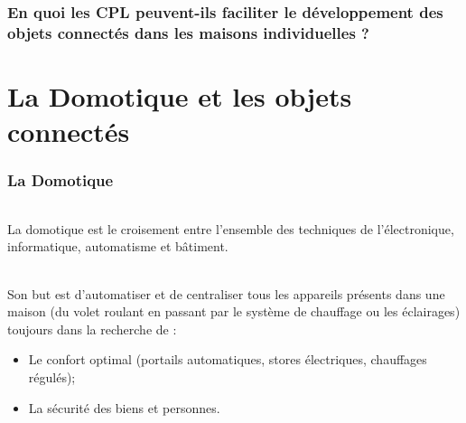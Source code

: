     \section*{En quoi les CPL peuvent-ils faciliter le développement des objets connectés dans les maisons individuelles ?}
    \clearpage


\part{La Domotique et les objets connectés}
    \section{La Domotique}
        \paragraph{}
La domotique est le croisement entre l’ensemble des techniques de l’électronique, informatique, automatisme et bâtiment.
        \paragraph{}
Son but est d’automatiser et de centraliser tous les appareils présents dans une maison
(du volet roulant en passant par le système de chauffage ou les éclairages) toujours dans la recherche de :
            \begin{itemize}
                \item Le confort optimal (portails automatiques, stores électriques, chauffages régulés);
                \item La sécurité des biens et personnes.
            \end{itemize}
